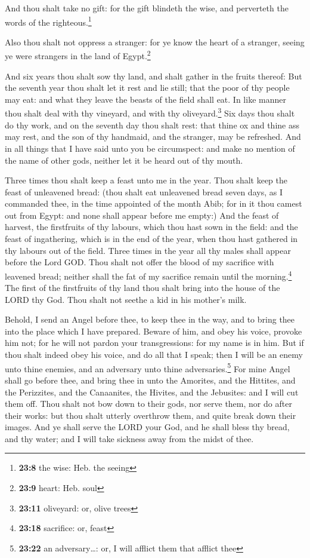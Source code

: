  And thou shalt take no gift: for the gift blindeth the
wise, and perverteth the words of the righteous.\footnote{\textbf{23:8}
  the wise: Heb. the seeing}

 Also thou shalt not oppress a stranger: for ye know the
heart of a stranger, seeing ye were strangers in the land of
Egypt.\footnote{\textbf{23:9} heart: Heb. soul}

 And six years thou shalt sow thy land, and shalt gather
in the fruits thereof:  But the seventh year thou shalt
let it rest and lie still; that the poor of thy people may eat: and what
they leave the beasts of the field shall eat. In like manner thou shalt
deal with thy vineyard, and with thy oliveyard.\footnote{\textbf{23:11}
  oliveyard: or, olive trees}  Six days thou shalt do thy
work, and on the seventh day thou shalt rest: that thine ox and thine
ass may rest, and the son of thy handmaid, and the stranger, may be
refreshed.  And in all things that I have said unto you
be circumspect: and make no mention of the name of other gods, neither
let it be heard out of thy mouth.

 Three times thou shalt keep a feast unto me in the year.
 Thou shalt keep the feast of unleavened bread: (thou
shalt eat unleavened bread seven days, as I commanded thee, in the time
appointed of the month Abib; for in it thou camest out from Egypt: and
none shall appear before me empty:)  And the feast of
harvest, the firstfruits of thy labours, which thou hast sown in the
field: and the feast of ingathering, which is in the end of the year,
when thou hast gathered in thy labours out of the field. 
Three times in the year all thy males shall appear before the Lord GOD.
 Thou shalt not offer the blood of my sacrifice with
leavened bread; neither shall the fat of my sacrifice remain until the
morning.\footnote{\textbf{23:18} sacrifice: or, feast} 
The first of the firstfruits of thy land thou shalt bring into the house
of the LORD thy God. Thou shalt not seethe a kid in his mother's milk.

 Behold, I send an Angel before thee, to keep thee in the
way, and to bring thee into the place which I have prepared.
 Beware of him, and obey his voice, provoke him not; for
he will not pardon your transgressions: for my name is in him.
 But if thou shalt indeed obey his voice, and do all that
I speak; then I will be an enemy unto thine enemies, and an adversary
unto thine adversaries.\footnote{\textbf{23:22} an adversary\ldots: or,
  I will afflict them that afflict thee}  For mine Angel
shall go before thee, and bring thee in unto the Amorites, and the
Hittites, and the Perizzites, and the Canaanites, the Hivites, and the
Jebusites: and I will cut them off.  Thou shalt not bow
down to their gods, nor serve them, nor do after their works: but thou
shalt utterly overthrow them, and quite break down their images.
 And ye shall serve the LORD your God, and he shall bless
thy bread, and thy water; and I will take sickness away from the midst
of thee.

